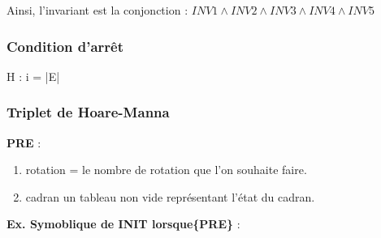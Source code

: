 \documentclass[a4paper, 12pt]{article}
\begin{document}
Ainsi, l'invariant est la conjonction : $INV 1 \wedge INV 2 \wedge INV 3 \wedge INV 4 \wedge INV 5$



\subsubsection*{Condition d'arrêt}

H : i = |E|

\subsubsection{Triplet de Hoare-Manna}

\textbf{PRE} :
\begin{enumerate}
 \item rotation = le nombre de rotation que l'on souhaite faire. 
 \item cadran un tableau non vide représentant l'état du cadran.
\end{enumerate}

\vspace{0.2cm}

\textbf{Ex. Symoblique de INIT lorsque\{PRE\}} :
\end{document}
